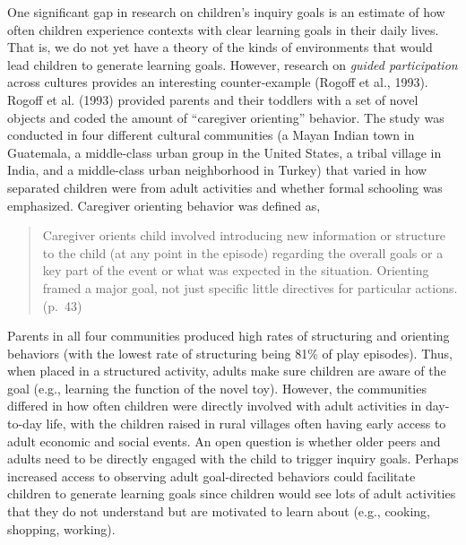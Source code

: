 \documentclass[oneside]{report}
\begin{document}
One significant gap in research on children's inquiry goals is an
estimate of how often children experience contexts with clear learning
goals in their daily lives. That is, we do not yet have a theory of the
kinds of environments that would lead children to generate learning
goals. However, research on \emph{guided participation} across cultures
provides an interesting counter-example (Rogoff et al., 1993). Rogoff et
al. (1993) provided parents and their toddlers with a set of novel
objects and coded the amount of ``caregiver orienting'' behavior. The
study was conducted in four different cultural communities (a Mayan
Indian town in Guatemala, a middle-class urban group in the United
States, a tribal village in India, and a middle-class urban neighborhood
in Turkey) that varied in how separated children were from adult
activities and whether formal schooling was emphasized. Caregiver
orienting behavior was defined as,
\begin{quote}
Caregiver orients child involved introducing new information or
structure to the child (at any point in the episode) regarding the
overall goals or a key part of the event or what was expected in the
situation. Orienting framed a major goal, not just specific little
directives for particular actions. (p.~43)
\end{quote}
\noindent Parents in all four communities produced high rates of
structuring and orienting behaviors (with the lowest rate of structuring
being 81\% of play episodes). Thus, when placed in a structured
activity, adults make sure children are aware of the goal (e.g.,
learning the function of the novel toy). However, the communities
differed in how often children were directly involved with adult
activities in day-to-day life, with the children raised in rural
villages often having early access to adult economic and social events.
An open question is whether older peers and adults need to be directly
engaged with the child to trigger inquiry goals. Perhaps increased
access to observing adult goal-directed behaviors could facilitate
children to generate learning goals since children would see lots of
adult activities that they do not understand but are motivated to learn
about (e.g., cooking, shopping, working).
\end{document}
